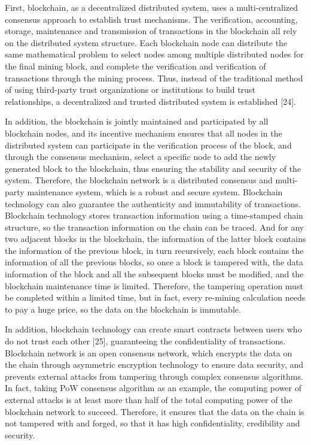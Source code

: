 \documentclass[lettersize,journal]{IEEEtran}
\begin{document}
First, blockchain, as a decentralized distributed system, uses a multi-centralized consensus approach to establish trust mechanisms. The verification, accounting, storage, maintenance and transmission of transactions in the blockchain all rely on the distributed system structure. Each blockchain node can distribute the same mathematical problem to select nodes among multiple distributed nodes for the final mining block, and complete the verification and verification of transactions through the mining process. Thus, instead of the traditional method of using third-party trust organizations or institutions to build trust relationships, a decentralized and trusted distributed system is established [24].

In addition, the blockchain is jointly maintained and participated by all blockchain nodes, and its incentive mechanism ensures that all nodes in the distributed system can participate in the verification process of the block, and through the consensus mechanism, select a specific node to add the newly generated block to the blockchain, thus ensuring the stability and security of the system. Therefore, the blockchain network is a distributed consensus and multi-party maintenance system, which is a robust and secure system. Blockchain technology can also guarantee the authenticity and immutability of transactions. Blockchain technology stores transaction information using a time-stamped chain structure, so the transaction information on the chain can be traced. And for any two adjacent blocks in the blockchain, the information of the latter block contains the information of the previous block, in turn recursively, each block contains the information of all the previous blocks, so once a block is tampered with, the data information of the block and all the subsequent blocks must be modified, and the blockchain maintenance time is limited. Therefore, the tampering operation must be completed within a limited time, but in fact, every re-mining calculation needs to pay a huge price, so the data on the blockchain is immutable.

In addition, blockchain technology can create smart contracts between users who do not trust each other [25], guaranteeing the confidentiality of transactions. Blockchain network is an open consensus network, which encrypts the data on the chain through asymmetric encryption technology to ensure data security, and prevents external attacks from tampering through complex consensus algorithms. In fact, taking PoW consensus algorithm as an example, the computing power of external attacks is at least more than half of the total computing power of the blockchain network to succeed. Therefore, it ensures that the data on the chain is not tampered with and forged, so that it has high confidentiality, credibility and security.
\end{document}

